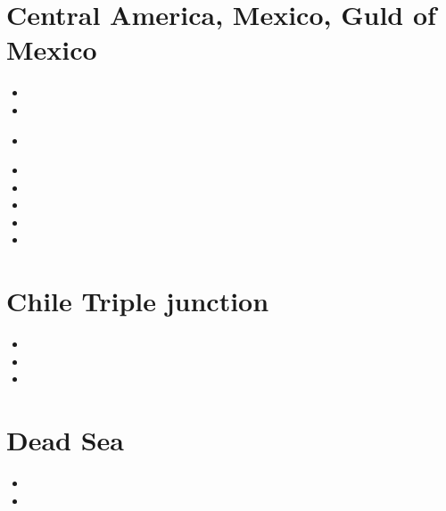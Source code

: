 \section{Central America, Mexico, Guld of Mexico}

\begin{small}
\begin{itemize}
\item[\twothousand] 
\item[\twothousandeight] 
\item[\twothousandnine] 
\\
\item[\twothousandtwelve] 
\item[\twothousandfifteen] 
\item[\twothousandsixteen] 
\item[\twothousandseventeen] 
\item[\twothousandtwentythree] 
\end{itemize}
\end{small}

\section{Chile Triple junction}

\begin{small}
\begin{itemize}
\item[\twothousandeight] 
\item[\twothousandtwelve] 
\item[\twothousandtwentythree] 
\end{itemize}
\end{small}


\section{Dead Sea} 

\begin{small}
\begin{itemize}
\item[\twothousandfive]
\item[\twothousandeleven]
\end{itemize}
\end{small}

